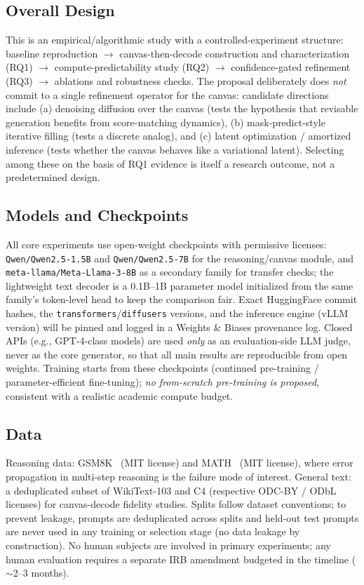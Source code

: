 \documentclass[11pt,a4paper]{article}
\begin{document}
\subsection{Overall Design}
This is an empirical/algorithmic study with a controlled-experiment structure: baseline reproduction $\rightarrow$ canvas-then-decode construction and characterization (RQ1) $\rightarrow$ compute-predictability study (RQ2) $\rightarrow$ confidence-gated refinement (RQ3) $\rightarrow$ ablations and robustness checks. The proposal deliberately does \emph{not} commit to a single refinement operator for the canvas: candidate directions include (a) denoising diffusion over the canvas (tests the hypothesis that revisable generation benefits from score-matching dynamics), (b) mask-predict-style iterative filling (tests a discrete analog), and (c) latent optimization / amortized inference (tests whether the canvas behaves like a variational latent). Selecting among these on the basis of RQ1 evidence is itself a research outcome, not a predetermined design.

\subsection{Models and Checkpoints}
All core experiments use open-weight checkpoints with permissive licenses: \texttt{Qwen/Qwen2.5-1.5B} and \texttt{Qwen/Qwen2.5-7B} for the reasoning/canvas module, and \texttt{meta-llama/Meta-Llama-3-8B} as a secondary family for transfer checks; the lightweight text decoder is a 0.1B--1B parameter model initialized from the same family's token-level head to keep the comparison fair. Exact HuggingFace commit hashes, the \texttt{transformers}/\texttt{diffusers} versions, and the inference engine (vLLM version) will be pinned and logged in a Weights \& Biases provenance log. Closed APIs (e.g., GPT-4-class models) are used \emph{only} as an evaluation-side LLM judge, never as the core generator, so that all main results are reproducible from open weights. Training starts from these checkpoints (continued pre-training / parameter-efficient fine-tuning); \emph{no from-scratch pre-training is proposed}, consistent with a realistic academic compute budget.

\subsection{Data}
Reasoning data: GSM8K~\cite{gsm8k} (MIT license) and MATH~\cite{math_dataset} (MIT license), where error propagation in multi-step reasoning is the failure mode of interest. General text: a deduplicated subset of WikiText-103 and C4 (respective ODC-BY / ODbL licenses) for canvas-decode fidelity studies. Splits follow dataset conventions; to prevent leakage, prompts are deduplicated across splits and held-out test prompts are never used in any training or selection stage (no data leakage by construction). No human subjects are involved in primary experiments; any human evaluation requires a separate IRB amendment budgeted in the timeline ($\sim$2--3 months).
\end{document}
